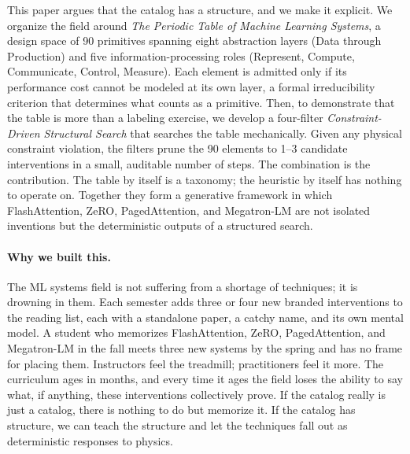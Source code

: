 \documentclass[10pt,twocolumn]{article}
\begin{document}
This paper argues that the catalog has a structure, and we make it explicit. We organize the field around \emph{The Periodic Table of Machine Learning Systems}, a design space of 90 primitives spanning eight abstraction layers (Data through Production) and five information-processing roles (Represent, Compute, Communicate, Control, Measure). Each element is admitted only if its performance cost cannot be modeled at its own layer, a formal irreducibility criterion that determines what counts as a primitive. Then, to demonstrate that the table is more than a labeling exercise, we develop a four-filter \emph{Constraint-Driven Structural Search} that searches the table mechanically. Given any physical constraint violation, the filters prune the 90 elements to 1--3 candidate interventions in a small, auditable number of steps. The combination is the contribution. The table by itself is a taxonomy; the heuristic by itself has nothing to operate on. Together they form a generative framework in which FlashAttention, ZeRO, PagedAttention, and Megatron-LM are not isolated inventions but the deterministic outputs of a structured search.

\paragraph{Why we built this.} The ML systems field is not suffering from a shortage of techniques; it is drowning in them. Each semester adds three or four new branded interventions to the reading list, each with a standalone paper, a catchy name, and its own mental model. A student who memorizes FlashAttention, ZeRO, PagedAttention, and Megatron-LM in the fall meets three new systems by the spring and has no frame for placing them. Instructors feel the treadmill; practitioners feel it more. The curriculum ages in months, and every time it ages the field loses the ability to say what, if anything, these interventions collectively prove. If the catalog really is just a catalog, there is nothing to do but memorize it. If the catalog has structure, we can teach the structure and let the techniques fall out as deterministic responses to physics.
\end{document}

